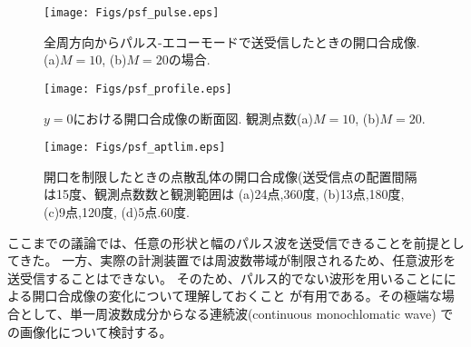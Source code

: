 \documentclass[10pt,a4j,dvipdfmx]{jarticle}
\begin{document}
\begin{figure}[h]
	\begin{center}
	\texttt{[image: Figs/psf\_pulse.eps]} 
	\end{center}
	\caption{全周方向からパルス-エコーモードで送受信したときの開口合成像.(a)$M=10$, (b)$M=20$の場合.} 
	\label{fig:psf_pulse}
\end{figure}
\begin{figure}[h]
	\begin{center}
	\texttt{[image: Figs/psf\_profile.eps]} 
	\end{center}
	\caption{$y=0$における開口合成像の断面図. 観測点数(a)$M=10$, (b)$M=20$.}
	\label{fig:psf_profile} 
\end{figure}
\begin{figure}[h]
	\begin{center}
	\texttt{[image: Figs/psf\_aptlim.eps]} 
	\end{center}
	\caption{開口を制限したときの点散乱体の開口合成像(送受信点の配置間隔は15度、観測点数数と観測範囲は
	(a)24点,360度, (b)13点,180度, (c)9点,120度, (d)5点.60度.} 
	\label{fig:}
\end{figure}
ここまでの議論では、任意の形状と幅のパルス波を送受信できることを前提としてきた。
一方、実際の計測装置では周波数帯域が制限されるため、任意波形を送受信することはできない。
そのため、パルス的でない波形を用いることにによる開口合成像の変化について理解しておくこと
が有用である。その極端な場合として、単一周波数成分からなる連続波(continuous monochlomatic wave)
での画像化について検討する。
\end{document}

